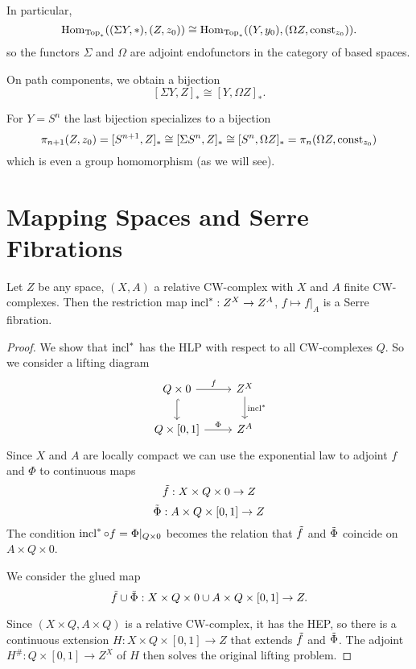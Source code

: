 In particular,
\[\operatorname{Hom}_{{\mathrm{Top}}_*}((\Sigma Y,*),(Z,z_0))\cong\operatorname{Hom}_{{\mathrm{Top}}_*}((Y,y_0),(\Omega Z,\operatorname{const}_{z_0})).\]
so the functors $\Sigma$ and $\Omega$ are adjoint endofunctors in the category of based spaces.

On path components, we obtain a bijection
\[[\Sigma Y,Z]_*\cong[Y,\Omega Z]_*.\]

For $Y=S^n$ the last bijection specializes to a bijection
\[\pi_{n+1}(Z,z_0)=[S^{n+1},Z]_*\cong[\Sigma S^n,Z]_*\cong[S^n,\Omega Z]_*=\pi_n(\Omega Z,\operatorname{const}_{z_0})\]
which is even a group homomorphism (as we will see).

\section{Mapping Spaces and Serre Fibrations}

\begin{theorem}
Let $Z$ be any space, $(X,A)$ a relative CW-complex with $X$ and $A$ finite CW-complexes. Then the restriction map $\operatorname{incl}^*:Z^X\to Z^A$, $f\mapsto f|_A$ is a Serre fibration.
\end{theorem}

\begin{proof}
We show that $\operatorname{incl}^*$ has the HLP with respect to all CW-complexes $Q$. So we consider a lifting diagram
\[\begin{tikzcd}
Q\times0 \arrow[d,hook] \arrow[r,"f"] & Z^X \arrow[d,"\incl^*"] \\
Q\times[0,1] \arrow[r,"\Phi"] & Z^A
\end{tikzcd}\]
Since $X$ and $A$ are locally compact we can use the exponential law to adjoint $f$ and $\Phi$ to continuous maps
\[\tilde f:X\times Q\times0\to Z\]
\[\tilde\Phi:A\times Q\times[0,1]\to Z\]
The condition $\operatorname{incl}^*\circ f=\Phi|_{Q\times0}$ becomes the relation that $\tilde f$ and $\tilde\Phi$ coincide on $A\times Q\times0$.

We consider the glued map
\[\tilde f\cup\tilde\Phi:X\times Q\times 0\cup A\times Q\times[0,1]\to Z.\]

Since $(X\times Q,A\times Q)$ is a relative CW-complex, it has the HEP, so there is a continuous extension $H:X\times Q\times[0,1]\to Z$ that extends $\tilde f$ and $\tilde\Phi$. The adjoint $H^\#:Q\times[0,1]\to Z^X$ of $H$ then solves the original lifting problem.
\end{proof}

